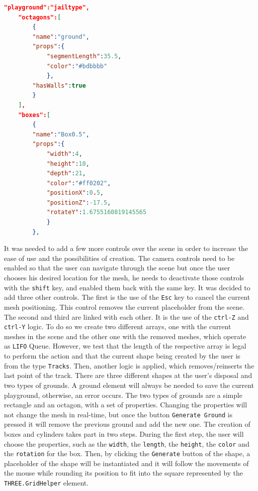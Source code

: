 \documentclass{scrreprt}
\begin{document}
\begin{lstlisting}[language=json, basicstyle=\ttfamily\small]
  "playground":"jailtype",
    "octagons":[
        {
        "name":"ground",
        "props":{
            "segmentLength":35.5,
            "color":"#bdbbbb"
            },
        "hasWalls":true
        }
    ],
    "boxes":[
        {
        "name":"Box0.5",
        "props":{
            "width":4,
            "height":10,
            "depth":21,
            "color":"#ff0202",
            "positionX":0.5,
            "positionZ":-17.5,
            "rotateY":1.6755160819145565
            }
        },
\end{lstlisting}

It was needed to add a few more controls over the scene in order to increase the ease of use and the possibilities of creation. The camera controls need to be enabled so that the user can navigate through the scene but once the user chooses his desired location for
the mesh, he needs to deactivate those controls with the \texttt{shift} key, and enabled them back with the same key. It was decided to add three other controls. The first is the use of the \texttt{Esc} key to cancel the current mesh positioning. This control removes the current placeholder from the scene. 
The second and third are linked with each other. It is the use of the \texttt{ctrl-Z} and \texttt{ctrl-Y} logic. To do so we create two different arrays, one with the current meshes in the scene and the other one with the removed meshes, which operate as \texttt{LIFO} Queue.
However, we test that the length of the respective array is legal to perform the action and that the current shape being created by the user is from the type \texttt{Tracks}. Then, another logic is applied, which removes/reinserts the last point of the track.
There are three different shapes at the user's disposal and two types of grounds. A ground element will always be needed to save the current playground, otherwise, an error occurs. The two types of grounds are a simple rectangle and an octagon, with a set of properties. 
Changing the properties will not change the mesh in real-time, but once the button \texttt{Generate Ground} is pressed it will remove the previous ground and add the new one. The creation of boxes and cylinders takes part in two steps. 
During the first step, the user will choose the properties, such as the \texttt{width}, the \texttt{length}, the \texttt{height}, the \texttt{color} and the \texttt{rotation} for the box. Then, by clicking the \texttt{Generate} button of the shape, 
a placeholder of the shape will be instantiated and it will follow the movements of the mouse while rounding its position to fit into the square represented by the \texttt{THREE.GridHelper} element. 
\end{document}
